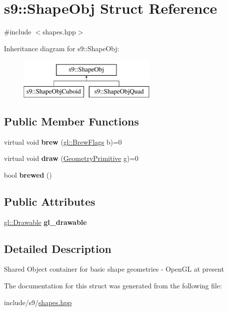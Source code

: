 \hypertarget{structs9_1_1ShapeObj}{\section{s9\-:\-:Shape\-Obj Struct Reference}
\label{structs9_1_1ShapeObj}
}


{\ttfamily \#include $<$shapes.\-hpp$>$}

Inheritance diagram for s9\-:\-:Shape\-Obj\-:\begin{figure}[H]
\begin{center}
\leavevmode
\includegraphics[height=2.000000cm]{structs9_1_1ShapeObj}
\end{center}
\end{figure}
\subsection*{Public Member Functions}
\begin{DoxyCompactItemize}
\item 
\hypertarget{structs9_1_1ShapeObj_aed1b4221696bfd60d22eeda7ddaf7d5f}{virtual void {\bfseries brew} (\hyperlink{structs9_1_1gl_1_1BrewFlags}{gl\-::\-Brew\-Flags} b)=0}\label{structs9_1_1ShapeObj_aed1b4221696bfd60d22eeda7ddaf7d5f}

\item 
\hypertarget{structs9_1_1ShapeObj_a8bba4a53945515203ade6683e5f1f8a6}{virtual void {\bfseries draw} (\hyperlink{namespaces9_ad57d1332f8fd67d23f6a1d3520ab785c}{Geometry\-Primitive} g)=0}\label{structs9_1_1ShapeObj_a8bba4a53945515203ade6683e5f1f8a6}

\item 
\hypertarget{structs9_1_1ShapeObj_a4817760158cb34aa5d484d91fc6486c4}{bool {\bfseries brewed} ()}\label{structs9_1_1ShapeObj_a4817760158cb34aa5d484d91fc6486c4}

\end{DoxyCompactItemize}
\subsection*{Public Attributes}
\begin{DoxyCompactItemize}
\item 
\hypertarget{structs9_1_1ShapeObj_a5d118dcbb724b552f9e1038d67a8deef}{\hyperlink{classs9_1_1gl_1_1Drawable}{gl\-::\-Drawable} {\bfseries gl\-\_\-drawable}}\label{structs9_1_1ShapeObj_a5d118dcbb724b552f9e1038d67a8deef}

\end{DoxyCompactItemize}


\subsection{Detailed Description}
Shared Object container for basic shape geometries -\/ Open\-G\-L at present 

The documentation for this struct was generated from the following file\-:\begin{DoxyCompactItemize}
\item 
include/s9/\hyperlink{shapes_8hpp}{shapes.\-hpp}\end{DoxyCompactItemize}
